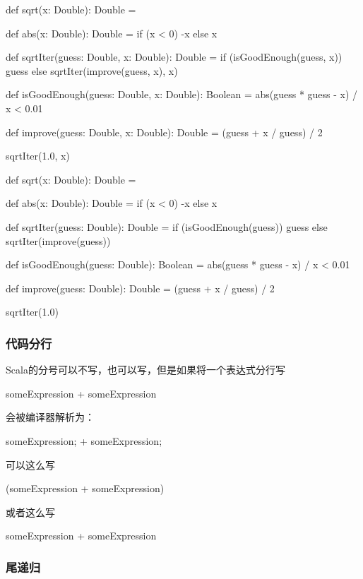 \begin{Scala}[嵌套]
  def sqrt(x: Double): Double = {

    def abs(x: Double): Double = if (x < 0) -x else x

    def sqrtIter(guess: Double, x: Double): Double =
      if (isGoodEnough(guess, x)) guess
      else sqrtIter(improve(guess, x), x)

    def isGoodEnough(guess: Double, x: Double): Boolean =
      abs(guess * guess - x) / x < 0.01

    def improve(guess: Double, x: Double): Double =
      (guess + x / guess) / 2

    sqrtIter(1.0, x)
  }      
\end{Scala}


\begin{Scala}
  def sqrt(x: Double): Double = {

    def abs(x: Double): Double = if (x < 0) -x else x

    def sqrtIter(guess: Double): Double =
      if (isGoodEnough(guess)) guess
      else sqrtIter(improve(guess))

    def isGoodEnough(guess: Double): Boolean =
      abs(guess * guess - x) / x < 0.01

    def improve(guess: Double): Double =
      (guess + x / guess) / 2

    sqrtIter(1.0)
  }  
\end{Scala}


\subsubsection{代码分行}
Scala的分号可以不写，也可以写，但是如果将一个表达式分行写

\begin{Scala}
someExpression
 + someExpression
\end{Scala}
会被编译器解析为：
\begin{Scala}
someExpression;
+ someExpression;
\end{Scala}

可以这么写
\begin{Scala}
(someExpression
 + someExpression)
\end{Scala}
或者这么写
\begin{Scala}
someExpression + 
	someExpression
\end{Scala}


\subsubsection{尾递归}

